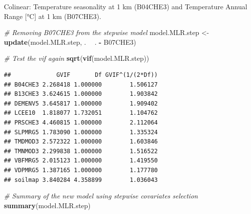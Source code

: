 \documentclass[10pt,b5paper,]{book}
\newenvironment{Shaded}{\begin{snugshade}}{\end{snugshade}}
\newcommand{\CommentTok}[1]{\textcolor[rgb]{0.56,0.35,0.01}{\textit{#1}}}
\newcommand{\KeywordTok}[1]{\textcolor[rgb]{0.13,0.29,0.53}{\textbf{#1}}}
\newcommand{\NormalTok}[1]{#1}
\newcommand{\OperatorTok}[1]{\textcolor[rgb]{0.81,0.36,0.00}{\textbf{#1}}}
\newcommand{\StringTok}[1]{\textcolor[rgb]{0.31,0.60,0.02}{#1}}
\theoremstyle{definition}
\theoremstyle{definition}
\theoremstyle{definition}
\theoremstyle{remark}
\begin{document}
Colinear: Temperature seasonality at 1 km (B04CHE3) and Temperature
Annual Range {[}°C{]} at 1 km (B07CHE3).

\begin{Shaded}
\begin{Highlighting}[]
\CommentTok{# Removing B07CHE3 from the stepwise model}
\NormalTok{model.MLR.step <-}\StringTok{ }\KeywordTok{update}\NormalTok{(model.MLR.step, . }\OperatorTok{~}\StringTok{ }\NormalTok{. }\OperatorTok{-}\StringTok{ }\NormalTok{B07CHE3)}

\CommentTok{# Test the vif again}
\KeywordTok{sqrt}\NormalTok{(}\KeywordTok{vif}\NormalTok{(model.MLR.step))}
\end{Highlighting}
\end{Shaded}

\begin{verbatim}
##             GVIF       Df GVIF^(1/(2*Df))
## B04CHE3 2.268418 1.000000        1.506127
## B13CHE3 3.624615 1.000000        1.903842
## DEMENV5 3.645817 1.000000        1.909402
## LCEE10  1.818077 1.732051        1.104762
## PRSCHE3 4.460815 1.000000        2.112064
## SLPMRG5 1.783090 1.000000        1.335324
## TMDMOD3 2.572322 1.000000        1.603846
## TMNMOD3 2.299838 1.000000        1.516522
## VBFMRG5 2.015123 1.000000        1.419550
## VDPMRG5 1.387165 1.000000        1.177780
## soilmap 3.840284 4.358899        1.036043
\end{verbatim}

\begin{Shaded}
\begin{Highlighting}[]
\CommentTok{# Summary of the new model using stepwise covariates selection}
\KeywordTok{summary}\NormalTok{(model.MLR.step)}
\end{Highlighting}
\end{Shaded}
\end{document}
